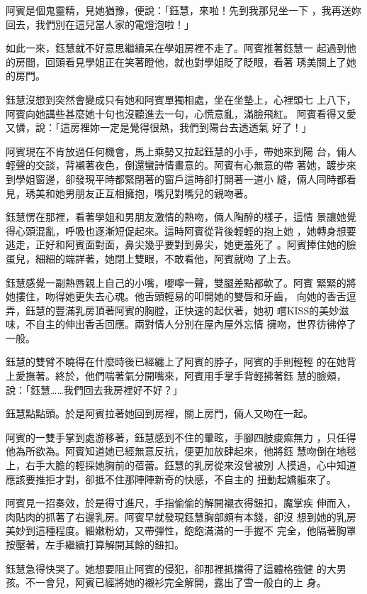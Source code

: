 阿賓是個鬼靈精，見她猶豫，便說：「鈺慧，來啦！先到我那兒坐一下
，我再送妳回去，我們別在這兒當人家的電燈泡啦！」

如此一來，鈺慧就不好意思繼續呆在學姐房裡不走了。阿賓推著鈺慧一
起過到他的房間，回頭看見學姐正在笑著瞪他，就也對學姐眨了眨眼，看著
琇美關上了她的房門。

鈺慧沒想到突然會變成只有她和阿賓單獨相處，坐在坐墊上，心裡頭七
上八下，阿賓向她講些甚麼她十句也沒聽進去一句，心慌意亂，滿臉飛紅。
阿賓看得又愛又憐，說：「這房裡妳一定是覺得很熱，我們到陽台去透透氣
好了！」

阿賓現在不肯放過任何機會，馬上乘勢又拉起鈺慧的小手，帶她來到陽
台，倆人輕聲的交談，背襯著夜色，倒還蠻詩情畫意的。阿賓有心無意的帶
著她，踱步來到學姐窗邊，卻發現平時都緊閉著的窗戶這時卻打開著一道小
縫，倆人同時都看見，琇美和她男朋友正互相擁抱，嘴兒對嘴兒的親吻著。

鈺慧愣在那裡，看著學姐和男朋友激情的熱吻，倆人陶醉的樣子，這情
景讓她覺得心頭混亂，呼吸也逐漸短促起來。這時阿賓從背後輕輕的抱上她
，她轉身想要逃走，正好和阿賓面對面，鼻尖幾乎要對到鼻尖，她更羞死了
。阿賓捧住她的臉蛋兒，細細的端詳著，她閉上雙眼，不敢看他，阿賓就吻
了上去。

鈺慧感覺一副熱唇親上自己的小嘴，嚶嚀一聲，雙腿差點都軟了。阿賓
緊緊的將她摟住，吻得她更失去心魂。他舌頭輕易的叩開她的雙唇和牙齒，
向她的香舌逗弄，鈺慧的豐滿乳房頂著阿賓的胸膛，正快速的起伏著，她初
嚐KISS的美妙滋味，不自主的伸出香舌回應。兩對情人分別在屋內屋外忘情
擁吻，世界彷彿停了一般。

鈺慧的雙臂不曉得在什麼時後已經纏上了阿賓的脖子，阿賓的手則輕輕
的在她背上愛撫著。終於，他們喘著氣分開嘴來，阿賓用手掌手背輕拂著鈺
慧的臉頰，說：「鈺慧……我們回去我房裡好不好？」

鈺慧點點頭。於是阿賓拉著她回到房裡，關上房門，倆人又吻在一起。

阿賓的一雙手掌到處游移著，鈺慧感到不住的暈眩，手腳四肢痠痲無力
，只任得他為所欲為。阿賓知道她已經無意反抗，便更加放肆起來，他將鈺
慧吻倒在地毯上，右手大膽的輕採她胸前的蓓蕾。鈺慧的乳房從來沒曾被別
人摸過，心中知道應該要推拒才對，卻抵不住那陣陣新奇的快感，不自主的
扭動起嬌軀來了。

阿賓見一招奏效，於是得寸進尺，手指偷偷的解開襯衣得鈕扣，魔掌疾
伸而入，肉貼肉的抓著了右邊乳房。阿賓早就發現鈺慧胸部頗有本錢，卻沒
想到她的乳房美妙到這種程度。細嫩粉幼，又帶彈性，飽飽滿滿的一手握不
完全，他隔著胸罩按壓著，左手繼續打算解開其餘的鈕扣。

鈺慧急得快哭了。她想要阻止阿賓的侵犯，卻那裡抵擋得了這體格強健
的大男孩。不一會兒，阿賓已經將她的襯衫完全解開，露出了雪一般白的上
身。

